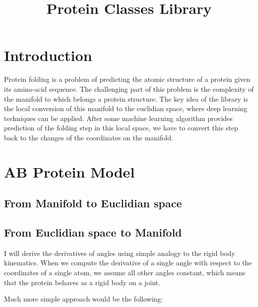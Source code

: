 \documentclass[a4paper,10pt]{article}
\title{Protein Classes Library}
\author{}
\begin{document}
\maketitle

\section{Introduction}
Protein folding is a problem of predicting the atomic structure of a protein given its amino-acid sequence. 
The challenging part of this problem is the complexity of the manifold to which belongs a protein structure.
The key idea of the library is the local conversion of this manifold to the euclidian space, where deep learning
techniques can be applied. After some machine learning algorithm provides prediction of the folding step in this 
local space, we have to convert this step back to the changes of the coordinates on the manifold.

\section{AB Protein Model}

\subsection{From Manifold to Euclidian space}
% 

\subsection{From Euclidian space to Manifold}
I will derive the derivatives of angles using simple analogy to the rigid body kinematics.
When we compute the derivative of a single angle with respect to the coordinates of a single atom, 
we assume all other angles constant, which means that the protein behaves as a rigid body on a joint.
% 


Much more simple approach would be the following:
% 



\end{document}
